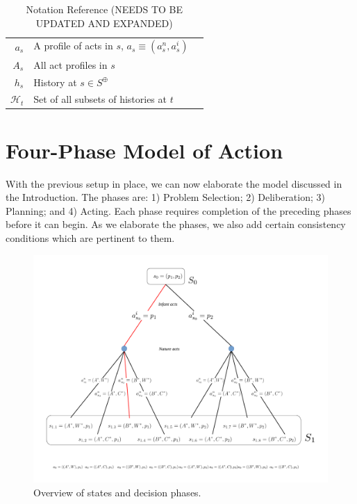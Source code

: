 \documentclass[
11pt,
titlepage,
reqno,
]{article}%
\theoremstyle{definition}
\begin{document}
\begin{table}
\begin{tabular}{@{}rll@{}}
$a_s$                                       & A profile of acts in $s$, $a_s\equiv(a^n_s,a^i_s)$ & \\
$A_s$                                    & All act profiles in $s$                               & \\
$h_s$                                & History at $s\in S^\oplus$                                    &  \\
$\mathcal{H}_t$                                    & Set of all subsets of histories at $t$                & \\
\bottomrule
\end{tabular}
\caption{Notation Reference (NEEDS TO BE UPDATED AND EXPANDED)}\label{Tab: Notation}
\end{table}
\pagebreak

\section{Four-Phase Model of Action}

With the previous setup in place, we can now elaborate the model discussed in the Introduction.
The phases are: 1) Problem Selection; 2) Deliberation; 3) Planning; and 4) Acting.
Each phase requires completion of the preceding phases before it can begin.
As we elaborate the phases, we also add certain consistency conditions which are pertinent to them.

\begin{figure}[h!]
	\centering
	\includegraphics*[page=8,trim = 0in 3in 0in 0in,scale=.65]{Awareness_Diagrams_All}
	\caption{Overview of states and decision phases.\label{Diag: p-08}}%
\end{figure}
\end{document}
